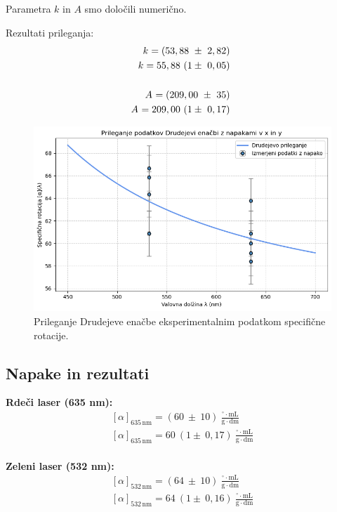 \documentclass[9pt,a4paper,twocolumn,twoside]{tau-class/tau}
\newcommand{\abserr}[5]{
    \ensuremath{#1_{#2} = (#3 \ \pm \ #4) \ #5}
}
\newcommand{\relerr}[5]{
    \ensuremath{#1_{#2} = #3 \ (1 \pm \ #4) \ #5}
}
\begin{document}
Parametra $k$ in $A$ smo določili numerično.


Rezultati prileganja:
\begin{align*}
\abserr{k}{}{53,88}{2,82}{} \\
\relerr{k}{}{55,88}{0,05}{} \\\\
\noindent \abserr{A}{}{209,00}{35}{} \\
\relerr{A}{}{209,00}{0,17}{}
\end{align*}

\begin{figure}[H]
    \centering
    \includegraphics[width=0.9\linewidth]{output.png}
    \caption{Prileganje Drudejeve enačbe eksperimentalnim podatkom specifične rotacije.}
    \label{fig:specrot}
\end{figure}

\subsection{Napake in rezultati}

\textbf{Rdeči laser (635 nm):}
\begin{align*}
\abserr{[\alpha]}{635\,\text{nm}}{60}{10}{} \frac{^\circ \cdot \mathrm{mL}}{\mathrm{g} \cdot \mathrm{dm}}\\
\relerr{[\alpha]}{635\,\text{nm}}{60}{0,17}{} \frac{^\circ \cdot \mathrm{mL}}{\mathrm{g} \cdot \mathrm{dm}}\\
\end{align*}

\textbf{Zeleni laser (532 nm):}
\begin{align*}
\abserr{[\alpha]}{532\,\text{nm}}{64}{10}{} \frac{^\circ \cdot \mathrm{mL}}{\mathrm{g} \cdot \mathrm{dm}}\\
\relerr{[\alpha]}{532\,\text{nm}}{64}{0,16}{} \frac{^\circ \cdot \mathrm{mL}}{\mathrm{g} \cdot \mathrm{dm}}\\
\end{align*}
\end{document}
